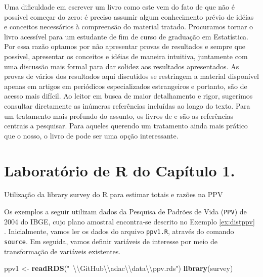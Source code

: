 \documentclass[]{book}
\newenvironment{Shaded}{\begin{snugshade}}{\end{snugshade}}
\newcommand{\KeywordTok}[1]{\textcolor[rgb]{0.13,0.29,0.53}{\textbf{{#1}}}}
\newcommand{\CharTok}[1]{\textcolor[rgb]{0.31,0.60,0.02}{{#1}}}
\newcommand{\StringTok}[1]{\textcolor[rgb]{0.31,0.60,0.02}{{#1}}}
\newcommand{\NormalTok}[1]{{#1}}
\numberwithin{example}{chapter}
\numberwithin{remark}{chapter}
\numberwithin{definition}{chapter}
\let\BeginKnitrBlock\begin \let\EndKnitrBlock\end
\begin{document}
Uma dificuldade em escrever um livro como este vem do fato de que não é
possível começar do zero: é preciso assumir algum conhecimento prévio de
idéias e conceitos necessários à compreensão do material tratado.
Procuramos tornar o livro acessível para um estudante de fim de curso de
graduação em Estatística. Por essa razão optamos por não apresentar
provas de resultados e sempre que possível, apresentar os conceitos e
idéias de maneira intuitiva, juntamente com uma discussão mais formal
para dar solidez aos resultados apresentados. As provas de vários dos
resultados aqui discutidos se restringem a material disponível apenas em
artigos em periódicos especializados estrangeiros e portanto, são de
acesso mais difícil. Ao leitor em busca de maior detalhamento e rigor,
sugerimos consultar diretamente as inúmeras referências incluídas ao
longo do texto. Para um tratamento mais profundo do assunto, os livros
de \citep{SHS89} e \citep{CHSK2003} são as referências centrais a
pesquisar. Para aqueles querendo um tratamento ainda mais prático que o
nosso, o livro de \citep{lethonen} pode ser uma opção interessante.

\section{Laboratório de R do Capítulo 1.}\label{epa}

\BeginKnitrBlock{example}
\protect\hypertarget{ex:unnamed-chunk-1}{}{\label{ex:unnamed-chunk-1}}Utilização
da library survey do R para estimar totais e razões na PPV
\EndKnitrBlock{example} Os exemplos a seguir utilizam dados da Pesquisa
de Padrões de Vida (\texttt{PPV}) de 2004 do IBGE, cujo plano amostral
encontra-se descrito no Exemplo \ref{ex:distppv} . Inicialmente, vamos
ler os dados do arquivo \texttt{ppv1.R}, através do comando
\texttt{source}. Em seguida, vamos definir variáveis de interesse por
meio de transformação de variáveis existentes.

\begin{Shaded}
\begin{Highlighting}[]
\NormalTok{ppv1 <-}\StringTok{ }\KeywordTok{readRDS}\NormalTok{(}\StringTok{"~}\CharTok{\textbackslash{}\textbackslash{}}\StringTok{GitHub}\CharTok{\textbackslash{}\textbackslash{}}\StringTok{adac}\CharTok{\textbackslash{}\textbackslash{}}\StringTok{data}\CharTok{\textbackslash{}\textbackslash{}}\StringTok{ppv.rds"}\NormalTok{)}
\KeywordTok{library}\NormalTok{(survey)}
\end{Highlighting}
\end{Shaded}
\end{document}
